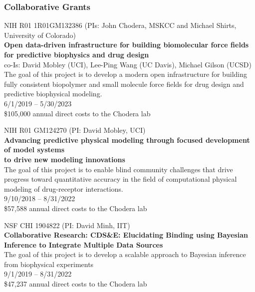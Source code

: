 \documentclass[10pt]{article}
\begin{document}

\subsubsection*{Collaborative Grants}

NIH R01 1R01GM132386 (PIs: John Chodera, MSKCC and Michael Shirts, University of Colorado) \\
{\bf Open data-driven infrastructure for building biomolecular force fields for predictive biophysics and drug design} \\
co-Is: David Mobley (UCI), Lee-Ping Wang (UC Davis), Michael Gilson (UCSD) \\
The goal of this project is to develop a modern open infrastructure for building fully consistent biopolymer and small molecule force fields for drug design and predictive biophysical modeling. \\
6/1/2019 -- 5/30/2023 \\
\$105,000 annual direct costs to the Chodera lab

\vspace{1.5ex}

NIH R01 GM124270 (PI: David Mobley, UCI) \\
{\bf Advancing predictive physical modeling through focused development of model systems\\ to drive new modeling innovations}\\
The goal of this project is to enable blind community challenges that drive progress toward quantitative accuracy in the field of computational physical modeling of drug-receptor interactions.\\
9/10/2018 -- 8/31/2022\\
\$57,588 annual direct costs to the Chodera lab

\vspace{1.5ex}

NSF CHI 1904822 (PI: David Minh, IIT) \\
{\bf Collaborative Research: CDS\&E: Elucidating Binding using Bayesian Inference to Integrate Multiple Data Sources}\\
The goal of this project is to develop a scalable approach to Bayesian inference from biophysical experiments\\
9/1/2019 -- 8/31/2022\\
\$47,237 annual direct costs to the Chodera lab

\vspace{1.5ex}
\end{document}
